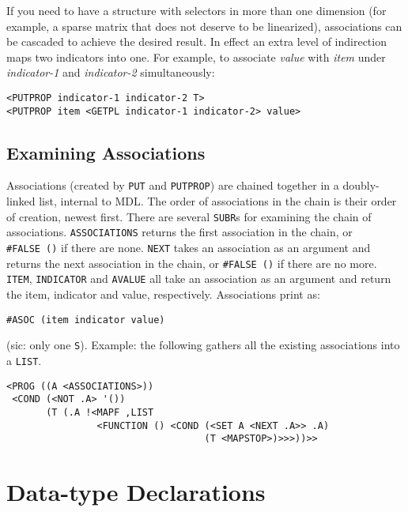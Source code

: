\documentclass[a4paper]{scrbook}
\begin{document}
If you need to have a structure with selectors in more than one dimension (for example, a sparse matrix that does not
deserve to be linearized), associations can be cascaded to achieve the desired result. In effect an extra level of
indirection maps two indicators into one. For example, to associate \emph{value} with \emph{item} under \emph{indicator-1}
and \emph{indicator-2} simultaneously:

\begin{verbatim}
<PUTPROP indicator-1 indicator-2 T>
<PUTPROP item <GETPL indicator-1 indicator-2> value>
\end{verbatim}

\section{Examining Associations}\label{examining-associations}

Associations (created by \texttt{PUT} and \texttt{PUTPROP}) are chained together in a doubly-linked list, internal to MDL.
The order of associations in the chain is their order of creation, newest first. There are several \texttt{SUBR}s for
examining the chain of associations. \texttt{ASSOCIATIONS}  returns the first
association in the chain, or \texttt{\#FALSE\ ()} if there are none. \texttt{NEXT}  takes an
association as an argument and returns the next association in the chain, or \texttt{\#FALSE\ ()} if there are no more.
\texttt{ITEM}, \texttt{INDICATOR}  and \texttt{AVALUE}
 all take an association as an argument and return the item, indicator and value,
respectively. Associations print as:

\begin{verbatim}
#ASOC (item indicator value)
\end{verbatim}

(sic: only one \texttt{S}). Example: the following gathers all the existing associations into a
\texttt{LIST}.

\begin{verbatim}
<PROG ((A <ASSOCIATIONS>))
 <COND (<NOT .A> '())
       (T (.A !<MAPF ,LIST
                <FUNCTION () <COND (<SET A <NEXT .A>> .A)
                                   (T <MAPSTOP>)>>>))>>
\end{verbatim}

\chapter{Data-type Declarations}\label{chapter-14.-data-type-declarations}
\end{document}
